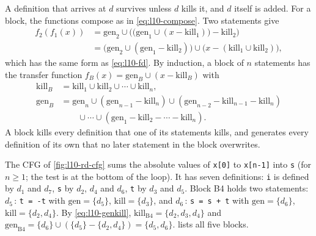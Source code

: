 \documentclass[../main.tex]{subfiles}
\begin{document}
  A definition that arrives at $d$ survives unless $d$
kills it, and $d$ itself is added.  For a block, the functions compose
as in \cref{eq:l10-compose}.  Two statements give
\begin{align*}
  f_2(f_1(x)) &= \mathrm{gen}_2 \cup \bigl(\bigl(\mathrm{gen}_1 \cup
    (x - \mathrm{kill}_1)\bigr) - \mathrm{kill}_2\bigr)\\
  &= \bigl(\mathrm{gen}_2 \cup (\mathrm{gen}_1 - \mathrm{kill}_2)\bigr)
     \cup \bigl(x - (\mathrm{kill}_1 \cup \mathrm{kill}_2)\bigr),
\end{align*}
which has the same form as \cref{eq:l10-fd}.  By induction, a block of
$n$ statements has the transfer function
$f_B(x)=\mathrm{gen}_B\cup(x-\mathrm{kill}_B)$ with
\begin{equation}
  \label{eq:l10-genkill}
  \begin{aligned}
    \mathrm{kill}_B &= \mathrm{kill}_1\cup\mathrm{kill}_2\cup\cdots\cup\mathrm{kill}_n,\\
    \mathrm{gen}_B &= \mathrm{gen}_n \cup (\mathrm{gen}_{n-1}-\mathrm{kill}_n)
      \cup (\mathrm{gen}_{n-2}-\mathrm{kill}_{n-1}-\mathrm{kill}_n)\\
      &\qquad\cup\cdots\cup(\mathrm{gen}_1-\mathrm{kill}_2-\cdots-\mathrm{kill}_n).
  \end{aligned}
\end{equation}
A block kills every definition that one of its statements kills, and
generates every definition of its own that no later statement in the
block overwrites.

\begin{example}
  \label{ex:l10-genkill}
  The CFG of \cref{fig:l10-rd-cfg} sums the absolute values of
  \texttt{x[0]} to \texttt{x[n-1]} into \texttt{s} (for $n\ge 1$;
  the test is at the bottom of the loop).  It has seven
  definitions: \texttt{i} is defined by $d_1$ and $d_7$, \texttt{s} by
  $d_2$, $d_4$ and $d_6$, \texttt{t} by $d_3$ and $d_5$.  Block B4
  holds two statements: $d_5$\,: \texttt{t = -t} with
  $\mathrm{gen}=\{d_5\}$, $\mathrm{kill}=\{d_3\}$, and
  $d_6$\,: \texttt{s = s + t} with $\mathrm{gen}=\{d_6\}$,
  $\mathrm{kill}=\{d_2,d_4\}$.  By \cref{eq:l10-genkill},
  $\mathrm{kill}_{\mathrm{B4}}=\{d_2,d_3,d_4\}$ and
  $\mathrm{gen}_{\mathrm{B4}}=\{d_6\}\cup(\{d_5\}-\{d_2,d_4\})=\{d_5,d_6\}$.
   lists all five blocks.
\end{example}
\end{document}
